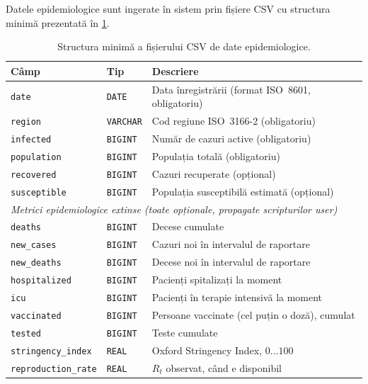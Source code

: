 Datele epidemiologice sunt ingerate în sistem prin fișiere CSV cu structura
minimă prezentată în \cref{tab:csv_schema}.

\begin{table}[t]
\centering
\caption[Structura fișierului CSV]{Structura minimă a fișierului CSV de date epidemiologice.}
\label{tab:csv_schema}
\begin{tabularx}{0.92\textwidth}{llX}
\toprule
\textbf{Câmp} & \textbf{Tip} & \textbf{Descriere} \\
\midrule
\texttt{date}        & \texttt{DATE}    & Data înregistrării (format ISO~8601, obligatoriu) \\
\texttt{region}      & \texttt{VARCHAR} & Cod regiune ISO~3166-2 (obligatoriu) \\
\texttt{infected}    & \texttt{BIGINT}  & Număr de cazuri active (obligatoriu) \\
\texttt{population}  & \texttt{BIGINT}  & Populația totală (obligatoriu) \\
\texttt{recovered}   & \texttt{BIGINT}  & Cazuri recuperate (opțional) \\
\texttt{susceptible} & \texttt{BIGINT}  & Populația susceptibilă estimată (opțional) \\
\midrule
\multicolumn{3}{l}{\emph{Metrici epidemiologice extinse (toate opționale, propagate scripturilor user)}} \\
\texttt{deaths}             & \texttt{BIGINT}  & Decese cumulate \\
\texttt{new\_cases}         & \texttt{BIGINT}  & Cazuri noi în intervalul de raportare \\
\texttt{new\_deaths}        & \texttt{BIGINT}  & Decese noi în intervalul de raportare \\
\texttt{hospitalized}       & \texttt{BIGINT}  & Pacienți spitalizați la moment \\
\texttt{icu}                & \texttt{BIGINT}  & Pacienți în terapie intensivă la moment \\
\texttt{vaccinated}         & \texttt{BIGINT}  & Persoane vaccinate (cel puțin o doză), cumulat \\
\texttt{tested}             & \texttt{BIGINT}  & Teste cumulate \\
\texttt{stringency\_index}  & \texttt{REAL}    & Oxford Stringency Index, $0\ldots 100$ \\
\texttt{reproduction\_rate} & \texttt{REAL}    & $R_t$ observat, când e disponibil \\
\bottomrule
\end{tabularx}
\end{table}

